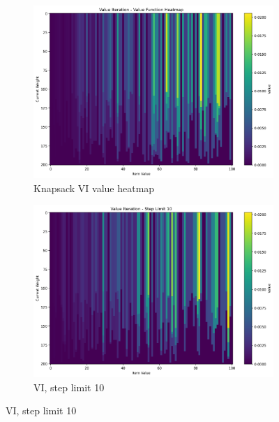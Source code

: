\documentclass[12pt]{article}
\begin{document}
\begin{figure}[H]
\centering
\begin{subcaptiongroup}
\begin{subfigure}{0.48\textwidth}
\includegraphics[width=\linewidth]{../Q2/part1/value_iteration_-_value_function_heatmap.png}
\caption{Knapsack VI value heatmap}
\end{subfigure}\hfill
\begin{subfigure}{0.48\textwidth}
\includegraphics[width=\linewidth]{../Q2/part1/value_iteration_-_step_limit_10.png}
\caption{VI, step limit 10}
\end{subfigure}
\end{subcaptiongroup}


\end{figure}
\end{document}
